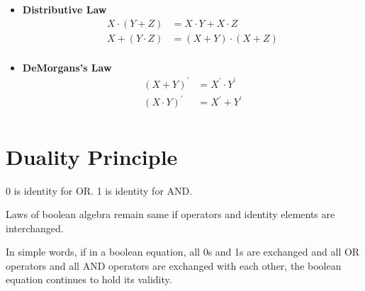 \documentclass[oneside]{book}
\begin{document}
\begin{itemize}
	\item \textbf{Distributive Law}\\
	      \begin{align*}
		      X \cdot( Y + Z) & = X\cdot Y + X\cdot Z   \\
		      X+(Y\cdot Z)    & = (X + Y) \cdot (X + Z) \\
	      \end{align*}
	\item \textbf{DeMorgans's Law}\\
	      \begin{align*}
		      ( X + Y)^\prime     & = X^\prime\cdot Y^\prime \\
		      ( X \cdot Y)^\prime & = X^\prime + Y^\prime    \\
	      \end{align*}
\end{itemize}

\section{Duality Principle}
0 is identity for OR. 1 is identity for AND.
\begin{center}
	Laws of boolean algebra remain same if operators and identity elements are interchanged.
\end{center}
In simple words, if in a boolean equation, all 0s and 1s are exchanged and all OR operators and all AND operators are exchanged with each other, the boolean equation continues to hold its validity.
\end{document}
